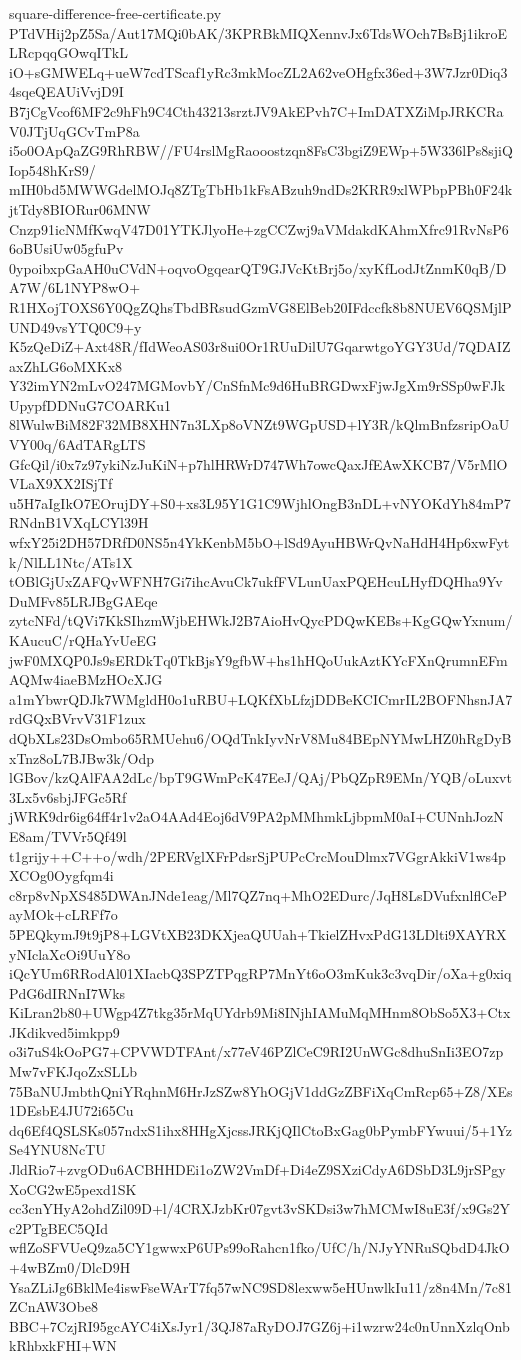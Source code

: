 \documentclass[11pt]{article}
\theoremstyle{definition}
\theoremstyle{remark}
\begin{document}
\begin{filecontents*}[overwrite]{square-difference-free-certificate.py}
PTdVHij2pZ5Sa/Aut17MQi0bAK/3KPRBkMIQXennvJx6TdsWOch7BsBj1ikroELRcpqqGOwqITkL
iO+sGMWELq+ueW7cdTScaf1yRc3mkMocZL2A62veOHgfx36ed+3W7Jzr0Diq34sqeQEAUiVvjD9I
B7jCgVcof6MF2c9hFh9C4Cth43213srztJV9AkEPvh7C+ImDATXZiMpJRKCRaV0JTjUqGCvTmP8a
i5o0OApQaZG9RhRBW//FU4rslMgRaooostzqn8FsC3bgiZ9EWp+5W336lPs8sjiQIop548hKrS9/
mIH0bd5MWWGdelMOJq8ZTgTbHb1kFsABzuh9ndDs2KRR9xlWPbpPBh0F24kjtTdy8BIORur06MNW
Cnzp91icNMfKwqV47D01YTKJlyoHe+zgCCZwj9aVMdakdKAhmXfrc91RvNsP66oBUsiUw05gfuPv
0ypoibxpGaAH0uCVdN+oqvoOgqearQT9GJVcKtBrj5o/xyKfLodJtZnmK0qB/DA7W/6L1NYP8wO+
R1HXojTOXS6Y0QgZQhsTbdBRsudGzmVG8ElBeb20IFdccfk8b8NUEV6QSMjlPUND49vsYTQ0C9+y
K5zQeDiZ+Axt48R/fIdWeoAS03r8ui0Or1RUuDilU7GqarwtgoYGY3Ud/7QDAIZaxZhLG6oMXKx8
Y32imYN2mLvO247MGMovbY/CnSfnMc9d6HuBRGDwxFjwJgXm9rSSp0wFJkUpypfDDNuG7COARKu1
8lWulwBiM82F32MB8XHN7n3LXp8oVNZt9WGpUSD+lY3R/kQlmBnfzsripOaUVY00q/6AdTARgLTS
GfcQil/i0x7z97ykiNzJuKiN+p7hlHRWrD747Wh7owcQaxJfEAwXKCB7/V5rMlOVLaX9XX2ISjTf
u5H7aIgIkO7EOrujDY+S0+xs3L95Y1G1C9WjhlOngB3nDL+vNYOKdYh84mP7RNdnB1VXqLCYl39H
wfxY25i2DH57DRfD0NS5n4YkKenbM5bO+lSd9AyuHBWrQvNaHdH4Hp6xwFytk/NlLL1Ntc/ATs1X
tOBlGjUxZAFQvWFNH7Gi7ihcAvuCk7ukfFVLunUaxPQEHcuLHyfDQHha9YvDuMFv85LRJBgGAEqe
zytcNFd/tQVi7KkSIhzmWjbEHWkJ2B7AioHvQycPDQwKEBs+KgGQwYxnum/KAucuC/rQHaYvUeEG
jwF0MXQP0Js9sERDkTq0TkBjsY9gfbW+hs1hHQoUukAztKYcFXnQrumnEFmAQMw4iaeBMzHOcXJG
a1mYbwrQDJk7WMgldH0o1uRBU+LQKfXbLfzjDDBeKCICmrIL2BOFNhsnJA7rdGQxBVrvV31F1zux
dQbXLs23DsOmbo65RMUehu6/OQdTnkIyvNrV8Mu84BEpNYMwLHZ0hRgDyBxTnz8oL7BJBw3k/Odp
lGBov/kzQAlFAA2dLc/bpT9GWmPcK47EeJ/QAj/PbQZpR9EMn/YQB/oLuxvt3Lx5v6sbjJFGc5Rf
jWRK9dr6ig64ff4r1v2aO4AAd4Eoj6dV9PA2pMMhmkLjbpmM0aI+CUNnhJozNE8am/TVVr5Qf49l
t1grijy++C++o/wdh/2PERVglXFrPdsrSjPUPcCrcMouDlmx7VGgrAkkiV1ws4pXCOg0Oygfqm4i
c8rp8vNpXS485DWAnJNde1eag/Ml7QZ7nq+MhO2EDurc/JqH8LsDVufxnlflCePayMOk+cLRFf7o
5PEQkymJ9t9jP8+LGVtXB23DKXjeaQUUah+TkielZHvxPdG13LDlti9XAYRXyNIclaXcOi9UuY8o
iQcYUm6RRodAl01XIacbQ3SPZTPqgRP7MnYt6oO3mKuk3c3vqDir/oXa+g0xiqPdG6dIRNnI7Wks
KiLran2b80+UWgp4Z7tkg35rMqUYdrb9Mi8INjhIAMuMqMHnm8ObSo5X3+CtxJKdikved5imkpp9
o3i7uS4kOoPG7+CPVWDTFAnt/x77eV46PZlCeC9RI2UnWGc8dhuSnIi3EO7zpMw7vFKJqoZxSLLb
75BaNUJmbthQniYRqhnM6HrJzSZw8YhOGjV1ddGzZBFiXqCmRcp65+Z8/XEs1DEsbE4JU72i65Cu
dq6Ef4QSLSKs057ndxS1ihx8HHgXjcssJRKjQIlCtoBxGag0bPymbFYwuui/5+1YzSe4YNU8NcTU
JldRio7+zvgODu6ACBHHDEi1oZW2VmDf+Di4eZ9SXziCdyA6DSbD3L9jrSPgyXoCG2wE5pexd1SK
cc3cnYHyA2ohdZil09D+l/4CRXJzbKr07gvt3vSKDsi3w7hMCMwI8uE3f/x9Gs2Yc2PTgBEC5QId
wflZoSFVUeQ9za5CY1gwwxP6UPs99oRahcn1fko/UfC/h/NJyYNRuSQbdD4JkO+4wBZm0/DlcD9H
YsaZLiJg6BklMe4iswFseWArT7fq57wNC9SD8lexww5eHUnwlkIu11/z8n4Mn/7c81ZCnAW3Obe8
BBC+7CzjRI95gcAYC4iXsJyr1/3QJ87aRyDOJ7GZ6j+i1wzrw24c0nUnnXzlqOnbkRhbxkFHI+WN

\end{filecontents*}
\end{document}
